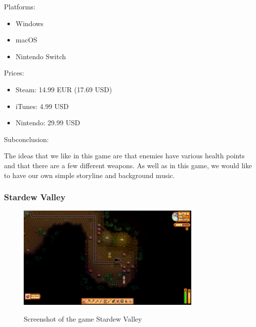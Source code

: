 \documentclass[12p]{article}
\begin{document}
\newpage

Platforms:

\begin{itemize}
    \item Windows
    \item macOS
    \item Nintendo Switch
\end{itemize}

Prices:

\begin{itemize}
  \item Steam: 14.99 EUR (17.69 USD)
  \item iTunes: 4.99 USD
  \item Nintendo: 29.99 USD
\end{itemize}

Subconclusion:

The ideas that we like in this game are that enemies have various health points and that there are a few different weapons. As well as in this game, we would like to have our own simple storyline and background music.


\newpage
\subsubsection[Stardew Valley]{Stardew Valley \cite{StardewValley}} \label{StardewValley}

\begin{figure}[ht]
  \center
  \includegraphics[width=0.8\textwidth]{StateOfTheArtScreenshots/stardew_valley}
  \label{sec:StateOfTheArt_Screenshots_StardewValley}
  \caption{Screenshot of the game Stardew Valley \cite{StardewValleyScreenshot}}
\end{figure}
\end{document}

